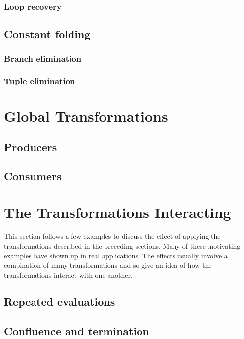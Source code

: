 \subsubsection{Loop recovery}

\subsection{Constant folding}
\subsubsection{Branch elimination}
\subsubsection{Tuple elimination}

\section{Global Transformations}
\subsection{Producers}
\subsection{Consumers}

\section{The Transformations Interacting}

This section follows a few examples to discuss the effect of applying the
transformations described in the preceding sections. Many of these motivating
examples have shown up in real applications. The effects usually involve a
combination of many transformations and so give an idea of how the
transformations interact with one another.

\subsection{Repeated evaluations}
\subsection{Confluence and termination}

